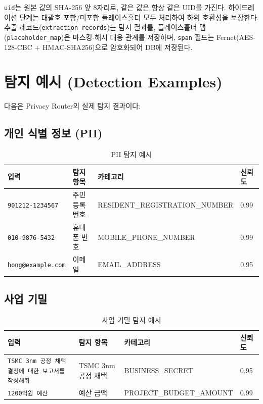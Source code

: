 \documentclass[11pt,a4paper]{article}
\begin{document}
\texttt{uid}는 원본 값의 SHA-256 앞 8자리로, 같은 값은 항상 같은 UID를 가진다. 하이드레이션 단계는 대괄호 포함/미포함 플레이스홀더 모두 처리하여 하위 호환성을 보장한다. 추출 레코드(\texttt{extraction\_records})는 탐지 결과를, 플레이스홀더 맵(\texttt{placeholder\_map})은 마스킹-해시 대응 관계를 저장하며, \texttt{span} 필드는 Fernet(AES-128-CBC + HMAC-SHA256)으로 암호화되어 DB에 저장된다.

\section{탐지 예시 (Detection Examples)}

다음은 Privacy Router의 실제 탐지 결과이다:

\subsection{개인 식별 정보 (PII)}

\begin{table}[h]
\centering
\begin{tabular}{@{}llll@{}}
\toprule
입력 & 탐지 항목 & 카테고리 & 신뢰도 \\
\midrule
\texttt{901212-1234567} & 주민등록번호 & RESIDENT\_REGISTRATION\_NUMBER & 0.99 \\
\texttt{010-9876-5432} & 휴대폰 번호 & MOBILE\_PHONE\_NUMBER & 0.99 \\
\texttt{hong@example.com} & 이메일 & EMAIL\_ADDRESS & 0.95 \\
\bottomrule
\end{tabular}
\caption{PII 탐지 예시}
\end{table}

\subsection{사업 기밀}

\begin{table}[h]
\centering
\begin{tabular}{@{}p{5cm}lll@{}}
\toprule
입력 & 탐지 항목 & 카테고리 & 신뢰도 \\
\midrule
\texttt{TSMC 3nm 공정 채택 결정에 대한 보고서를 작성해줘} & TSMC 3nm 공정 채택 & BUSINESS\_SECRET & 0.95 \\
\texttt{1200억원 예산} & 예산 금액 & PROJECT\_BUDGET\_AMOUNT & 0.99 \\
\bottomrule
\end{tabular}
\caption{사업 기밀 탐지 예시}
\end{table}
\end{document}
